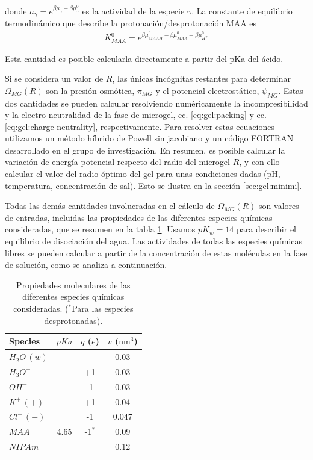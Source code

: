\noindent donde $a_\gamma = e^{\beta\mu_\gamma-\beta\mu_\gamma^0}$ es la actividad de la especie $\gamma$. 
La constante de equilibrio termodin\'amico que describe la protonaci\'on/desprotonaci\'on MAA es
%
%
\begin{align}
K^0_{MAA}= e^{\beta\mu^0_{MAAH}-\beta\mu^0_{MAA}-\beta\mu^0_{H^+}}
\end{align}

\noindent Esta cantidad es posible calcularla directamente a partir del pKa del \'acido.


Si se considera  un valor de  $R$, las \'unicas inc\'ognitas restantes para determinar $\Omega_{MG}(R)$ son la presi\'on osm\'otica, $\pi_{MG}$ y el potencial electrost\'atico, $\psi_{MG}$.
Estas dos cantidades se pueden calcular resolviendo num\'ericamente la incompresibilidad y la electro-neutralidad de la fase de microgel, ec. \ref{eq:gel:packing} y ec. \ref{eq:gel:charge-neutrality}, respectivamente.
Para resolver estas ecuaciones utilizamos un m\'etodo h\'ibrido de Powell sin jacobiano y un c\'odigo FORTRAN desarrollado en el grupo de investigaci\'on.
En resumen, es posible calcular la variaci\'on de energ\'ia potencial respecto del radio del microgel $R$, y con ello calcular el valor del radio \'optimo del gel para unas condiciones dadas (pH, temperatura, concentraci\'on de sal). Esto se ilustra en la secci\'on \ref{sec:gel:minimi}.

Todas las dem\'as cantidades involucradas en el c\'alculo de $\Omega_{MG}(R)$ son valores de  entradas, incluidas las propiedades de las diferentes especies qu\'imicas consideradas, que se resumen en la tabla \ref{table:gel:molecules}.
Usamos $pK_w=14$ para describir el equilibrio de disociaci\'on del agua.
Las actividades de todas las especies qu\'imicas libres se pueden calcular a partir de la concentraci\'on de estas mol\'eculas en la fase de soluci\'on, como se analiza a continuaci\'on.


\begin{table}
	\centering
\begin{tabular}{|lccc|}
    \hline
    {Species} & {$pKa$} & {$q$ ($e$)} & {$v$ ($\text{nm}^3$)} \\
      \hline
$H_2O\,(w)$ & ~ & ~ & 0.03\\
$H_3O^+$ & ~ & +1 & 0.03\\
$OH^-$ & ~ & -1 & 0.03\\
$K^+\,(+)$ & ~ & +1 & 0.04\\ 
$Cl^-\,(-)$ & ~ & -1 & 0.047\\
$MAA$ & 4.65 & -1$^\ast$ & 0.09\\
$NIPAm$ & ~ & ~ & 0.12\\
    \hline
  \end{tabular}
 \caption{Propiedades moleculares de las diferentes especies qu\'imicas consideradas.
 	\footnotesize ($^\ast$Para las especies desprotonadas).}
\label{table:gel:molecules} 
\end{table}


